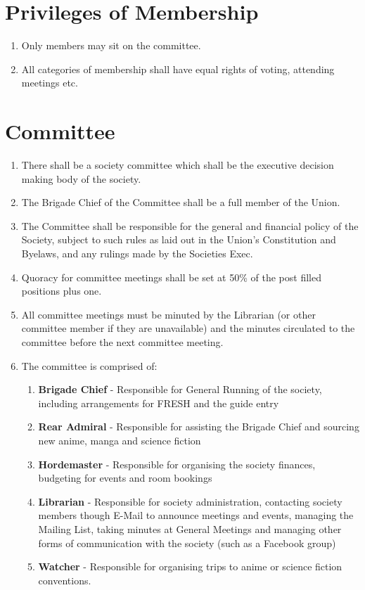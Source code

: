 \documentclass[a4paper,10pt]{article}
\begin{document}
\section{Privileges of Membership}
\begin{enumerate}
  \item Only members may sit on the committee.
  \item All categories of membership shall have equal rights of voting, attending meetings etc.
\end{enumerate}

\section{Committee}
\begin{enumerate}
  \item There shall be a society committee which shall be the executive decision making body of the society.
  \item The Brigade Chief of the Committee shall be a full member of the Union.
  \item The Committee shall be responsible for the general and financial policy of the Society, subject to such rules as laid out in the Union’s Constitution and Byelaws, and any rulings made by the Societies Exec.
  \item Quoracy for committee meetings shall be set at 50\% of the post filled positions plus one.
  \item All committee meetings must be minuted by the Librarian (or other committee member if they are unavailable) and the minutes circulated to the committee before the next committee meeting.
  \item The committee is comprised of:
  \begin{enumerate}
    \item \textbf{Brigade Chief} - Responsible for General Running of the society, including arrangements for FRESH and the guide entry
    \item \textbf{Rear Admiral} - Responsible for assisting the Brigade Chief and sourcing new anime, manga and science fiction
    \item \textbf{Hordemaster} - Responsible for organising the society finances, budgeting for events and room bookings
    \item \textbf{Librarian} - Responsible for society administration, contacting society members though E-Mail to announce meetings and events, managing the Mailing List, taking minutes at General Meetings and managing other forms of communication with the society (such as a Facebook group)
    \item \textbf{Watcher} - Responsible for organising trips to anime or science fiction conventions.
  \end{enumerate}
\end{enumerate}
\end{document}
